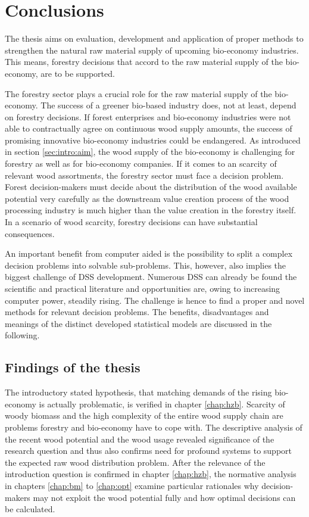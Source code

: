 \chapter{Conclusions}
\label{chap:discussion}
\newpage
\noindent
The thesis aims on evaluation, development and application of proper methods to strengthen the natural raw material supply of upcoming bio-economy industries. This means, forestry decisions that accord to the raw material supply of the bio-economy, are to be supported.

The forestry sector plays a crucial role for the raw material supply of the bio-economy. The success of a greener bio-based industry does, not at least, depend on forestry decisions. If forest enterprises and bio-economy industries were not able to contractually agree on continuous wood supply amounts, the success of promising innovative bio-economy industries could be endangered. As introduced in section \ref{sec:intro:aim}, the wood supply of the bio-economy is challenging for forestry as well as for bio-economy companies. If it comes to an scarcity of relevant wood assortments, the forestry sector must face a decision problem. Forest decision-makers must decide about the distribution of the wood available potential very carefully as the downstream value creation process of the wood processing industry is much higher than the value creation in the forestry itself. In a scenario of wood scarcity, forestry decisions can have substantial consequences.

An important benefit from computer aided is the possibility to split a complex decision problems into solvable sub-problems. This, however, also implies the biggest challenge of DSS development. Numerous DSS can already be found the scientific and practical literature and opportunities are, owing to increasing computer power, steadily rising. The challenge is hence to find a proper and novel methods for relevant decision problems. The benefits, disadvantages and meanings of the distinct developed statistical models are discussed in the following.

\section{Findings of the thesis}
\label{sec:discussion:findings}
The introductory stated hypothesis, that matching demands of the rising bio-economy is actually problematic, is verified in chapter \ref{chap:hzb}. Scarcity of woody biomass and the high complexity of the entire wood supply chain are problems forestry and bio-economy have to cope with. The descriptive analysis of the recent wood potential and the wood usage revealed significance of the research question and thus also confirms need for profound systems to support the expected raw wood distribution problem. After the relevance of the introduction question is confirmed in chapter \ref{chap:hzb}, the normative analysis in chapters \ref{chap:bm} to \ref{chap:opt} examine particular rationales why decision-makers may not exploit the wood potential fully and how optimal decisions can be calculated.

